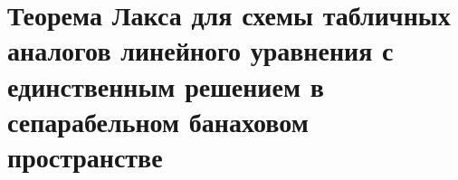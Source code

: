 \documentclass[__main__.tex]{subfiles}
\begin{document}
\section{Теорема Лакса для схемы табличных аналогов линейного уравнения с единственным решением в сепарабельном банаховом пространстве}
\end{document}
